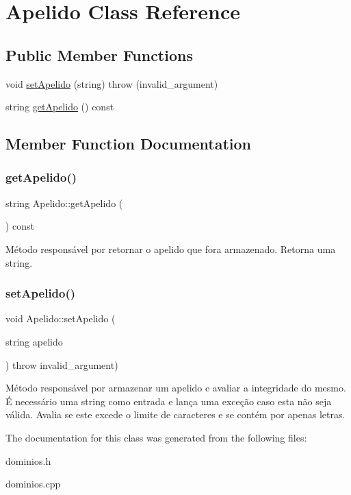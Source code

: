 \hypertarget{classApelido}{}\section{Apelido Class Reference}
\label{classApelido}
\subsection*{Public Member Functions}
\begin{DoxyCompactItemize}
\item 
void \hyperlink{classApelido_a2cb01229e3c1120858ef6c1f692432da}{set\+Apelido} (string)  throw (invalid\+\_\+argument)
\item 
string \hyperlink{classApelido_af3547459a5aff2cd4d6e2befe69ffe12}{get\+Apelido} () const
\end{DoxyCompactItemize}


\subsection{Member Function Documentation}
\mbox{\label{classApelido_af3547459a5aff2cd4d6e2befe69ffe12}} 
\subsubsection{\texorpdfstring{get\+Apelido()}{getApelido()}}
{\footnotesize\ttfamily string Apelido\+::get\+Apelido (\begin{DoxyParamCaption}{ }\end{DoxyParamCaption}) const\hspace{0.3cm}{\ttfamily [inline]}}

Método responsável por retornar o apelido que fora armazenado. Retorna uma string. \mbox{\label{classApelido_a2cb01229e3c1120858ef6c1f692432da}} 
\subsubsection{\texorpdfstring{set\+Apelido()}{setApelido()}}
{\footnotesize\ttfamily void Apelido\+::set\+Apelido (\begin{DoxyParamCaption}\item[{string}]{apelido }\end{DoxyParamCaption}) throw  invalid\+\_\+argument) }

Método responsável por armazenar um apelido e avaliar a integridade do mesmo. É necessário uma string como entrada e lança uma exceção caso esta não seja válida. Avalia se este excede o limite de caracteres e se contém por apenas letras. 

The documentation for this class was generated from the following files\+:\begin{DoxyCompactItemize}
\item 
dominios.\+h\item 
dominios.\+cpp\end{DoxyCompactItemize}

